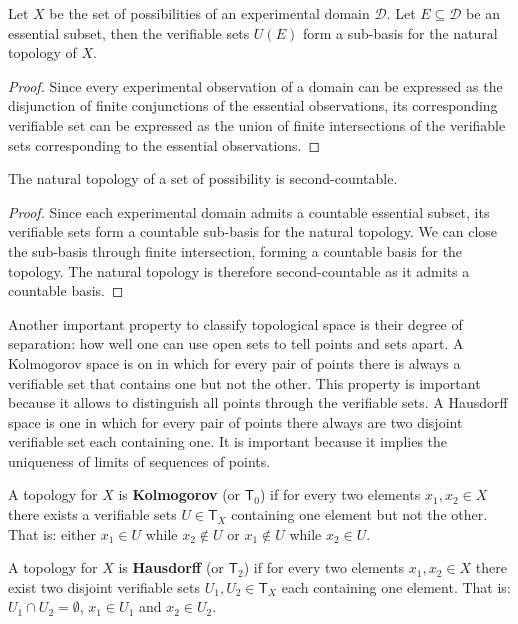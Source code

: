 \documentclass[11pt,letterpaper,fleqn]{memoir} %
\begin{document}
\begin{mathSection}
	\begin{prop}
		Let $X$ be the set of possibilities of an experimental domain $\mathcal{D}$. Let $E \subseteq \mathcal{D}$ be an essential subset, then the verifiable sets $U(E)$ form a sub-basis for the natural topology of $X$.
	\end{prop}
	\begin{proof}
		Since every experimental observation of a domain can be expressed as the disjunction of finite conjunctions of the essential observations, its corresponding verifiable set can be expressed as the union of finite intersections of the verifiable sets corresponding to the essential observations.
	\end{proof}
	\begin{prop}
		The natural topology of a set of possibility is second-countable.
	\end{prop}
	\begin{proof}
		Since each experimental domain admits a countable essential subset, its verifiable sets form a countable sub-basis for the natural topology. We can close the sub-basis through finite intersection, forming a countable basis for the topology. The natural topology is therefore second-countable as it admits a countable basis.
\end{proof}
\end{mathSection}

Another important property to classify topological space is their degree of separation: how well one can use open sets to tell points and sets apart. A Kolmogorov space is on in which for every pair of points there is always a verifiable set that contains one but not the other. This property is important because it allows to distinguish all points through the verifiable sets. A Hausdorff space is one in which for every pair of points there always are two disjoint verifiable set each containing one. It is important because it implies the uniqueness of limits of sequences of points.

\begin{mathSection}
	\begin{defn}
		A topology for $X$ is \textbf{Kolmogorov} (or $\mathsf{T}_0$) if for every two elements $x_1, x_2 \in X$ there exists a verifiable sets $U \in \mathsf{T}_X$ containing one element but not the other. That is: either $x_1 \in U$ while $x_2 \notin U$ or $x_1 \notin U$ while $x_2 \in U$.
	\end{defn}
	\begin{defn}
	A topology for $X$ is \textbf{Hausdorff} (or $\mathsf{T}_2$) if for every two elements $x_1, x_2 \in X$ there exist two disjoint verifiable sets $U_1, U_2 \in \mathsf{T}_X$ each containing one element. That is: $U_1 \cap U_2 = \emptyset$, $x_1 
	\in U_1$ and $x_2 \in U_2$.
\end{defn}

\end{mathSection}
\end{document}
